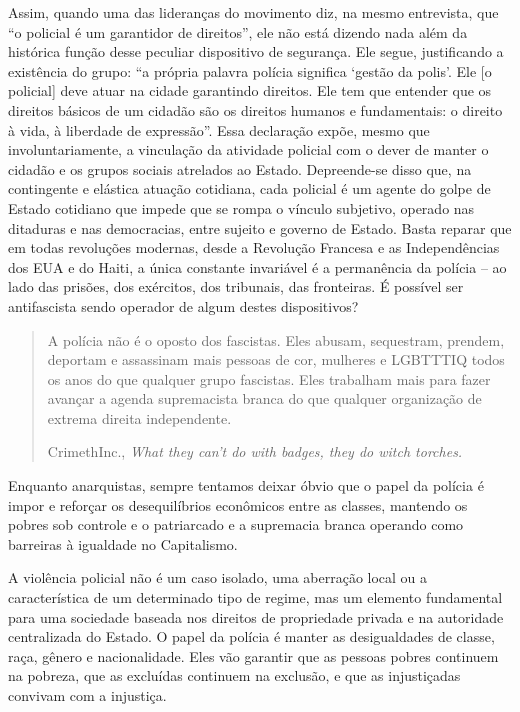 Assim, quando uma das lideranças do movimento diz, na mesmo entrevista, que “o policial é um garantidor de direitos”, ele não está dizendo nada além da histórica função desse peculiar dispositivo de segurança. Ele segue, justificando a existência do grupo: “a própria palavra polícia significa ‘gestão da polis’. Ele [o policial] deve atuar na cidade garantindo direitos. Ele tem que entender que os direitos básicos de um cidadão são os direitos humanos e fundamentais: o direito à vida, à liberdade de expressão”. Essa declaração expõe, mesmo que involuntariamente, a vinculação da atividade policial com o dever de manter o cidadão e os grupos sociais atrelados ao Estado. Depreende-se disso que, na contingente e elástica atuação cotidiana, cada policial é um agente do golpe de Estado cotidiano que impede que se rompa o vínculo subjetivo, operado nas ditaduras e nas democracias, entre sujeito e governo de Estado. Basta reparar que em todas revoluções modernas, desde a Revolução Francesa e as Independências dos EUA e do Haiti, a única constante invariável é a permanência da polícia – ao lado das prisões, dos exércitos, dos tribunais, das fronteiras. É possível ser antifascista sendo operador de algum destes dispositivos?

\begin{quote}
A polícia não é o oposto dos fascistas. Eles abusam, sequestram, prendem, deportam e assassinam mais pessoas de cor, mulheres e LGBTTTIQ todos os anos do que qualquer grupo fascistas. Eles trabalham mais para fazer avançar a agenda supremacista branca do que qualquer organização de extrema direita independente.

CrimethInc., \emph{What they can’t do with badges, they do witch torches.}
\end{quote}

Enquanto anarquistas, sempre tentamos deixar óbvio que o papel da polícia é impor e reforçar os desequilíbrios econômicos entre as classes, mantendo os pobres sob controle e o patriarcado e a supremacia branca operando como barreiras à igualdade no Capitalismo.

A violência policial não é um caso isolado, uma aberração local ou a característica de um determinado tipo de regime, mas um elemento fundamental para uma sociedade baseada nos direitos de propriedade privada e na autoridade centralizada do Estado. O papel da polícia é manter as desigualdades de classe, raça, gênero e nacionalidade. Eles vão garantir que as pessoas pobres continuem na pobreza, que as excluídas continuem na exclusão, e que as injustiçadas convivam com a injustiça.

